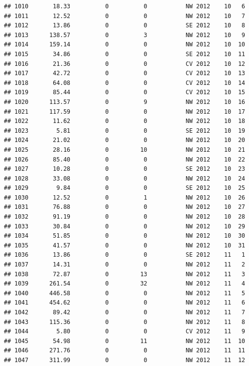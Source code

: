 \documentclass[
]{article}
\begin{document}
\begin{verbatim}
## 1010       18.33          0          0           NW 2012    10   6
## 1011       12.52          0          0           NW 2012    10   7
## 1012       13.86          0          0           SE 2012    10   8
## 1013      138.57          0          3           NW 2012    10   9
## 1014      159.14          0          0           NW 2012    10  10
## 1015       34.86          0          0           SE 2012    10  11
## 1016       21.36          0          0           CV 2012    10  12
## 1017       42.72          0          0           CV 2012    10  13
## 1018       64.08          0          0           CV 2012    10  14
## 1019       85.44          0          0           CV 2012    10  15
## 1020      113.57          0          9           NW 2012    10  16
## 1021      117.59          0          0           NW 2012    10  17
## 1022       11.62          0          0           NW 2012    10  18
## 1023        5.81          0          0           SE 2012    10  19
## 1024       21.02          0          0           NW 2012    10  20
## 1025       28.16          0         10           NW 2012    10  21
## 1026       85.40          0          0           NW 2012    10  22
## 1027       10.28          0          0           SE 2012    10  23
## 1028       33.08          0          0           NW 2012    10  24
## 1029        9.84          0          0           SE 2012    10  25
## 1030       12.52          0          1           NW 2012    10  26
## 1031       76.88          0          0           NW 2012    10  27
## 1032       91.19          0          0           NW 2012    10  28
## 1033       30.84          0          0           NW 2012    10  29
## 1034       51.85          0          0           NW 2012    10  30
## 1035       41.57          0          0           NW 2012    10  31
## 1036       13.86          0          0           SE 2012    11   1
## 1037       14.31          0          0           NW 2012    11   2
## 1038       72.87          0         13           NW 2012    11   3
## 1039      261.54          0         32           NW 2012    11   4
## 1040      446.58          0          0           NW 2012    11   5
## 1041      454.62          0          0           NW 2012    11   6
## 1042       89.42          0          0           NW 2012    11   7
## 1043      115.36          0          0           NW 2012    11   8
## 1044        5.80          0          0           CV 2012    11   9
## 1045       54.98          0         11           NW 2012    11  10
## 1046      271.76          0          0           NW 2012    11  11
## 1047      311.99          0          0           NW 2012    11  12

\end{verbatim}
\end{document}
